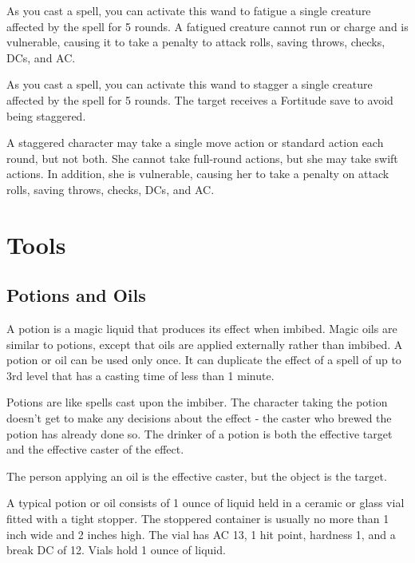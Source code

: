 
 As you cast a spell, you can activate this wand to fatigue a single creature affected by the spell for 5 rounds. A fatigued creature cannot run or charge and is vulnerable, causing it to take a  penalty to attack rolls, saving throws, checks, DCs, and AC.


 As you cast a spell, you can activate this wand to stagger a single creature affected by the spell for 5 rounds. The target receives a Fortitude save to avoid being staggered.

A staggered character may take a single move action or standard action each round, but not both. She cannot take full-round actions, but she may take swift actions. In addition, she is vulnerable, causing her to take a  penalty on attack rolls, saving throws, checks, DCs, and AC.


\section{Tools}

\subsection{Potions and Oils}

A potion is a magic liquid that produces its effect when imbibed. Magic oils are similar to potions, except that oils are applied externally rather than imbibed. A potion or oil can be used only once. It can duplicate the effect of a spell of up to 3rd level that has a casting time of less than 1 minute.

Potions are like spells cast upon the imbiber. The character taking the potion doesn't get to make any decisions about the effect  - the caster who brewed the potion has already done so. The drinker of a potion is both the effective target and the effective caster of the effect.

The person applying an oil is the effective caster, but the object is the target.

 A typical potion or oil consists of 1 ounce of liquid held in a ceramic or glass vial fitted with a tight stopper. The stoppered container is usually no more than 1 inch wide and 2 inches high. The vial has AC 13, 1 hit point, hardness 1, and a break DC of 12. Vials hold 1 ounce of liquid.

